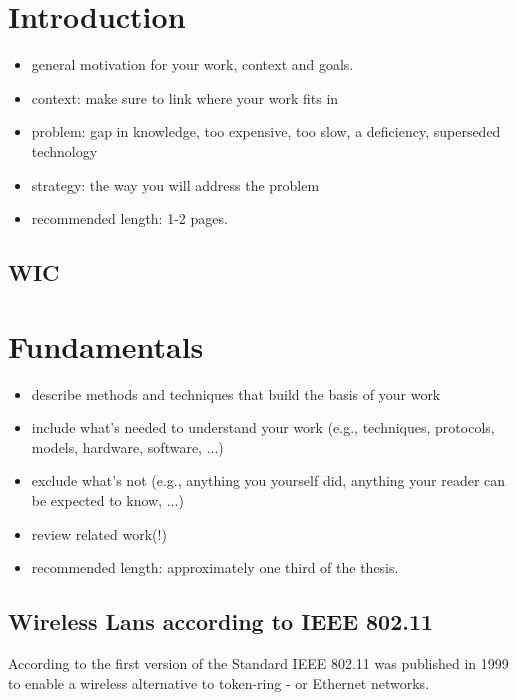 \documentclass[]{nsm-thesis}
\begin{document}
\cleardoublepage
{}


\chapter{Introduction}
\label{sec:introduction}

\begin{itemize}
\item general motivation for your work, context and goals.
\item context: make sure to link where your work fits in
\item problem: gap in knowledge, too expensive, too slow, a deficiency, superseded technology
\item strategy: the way you will address the problem
\item recommended length: 1-2 pages.
\end{itemize}

\section{\acl{WIC}}



\chapter{Fundamentals}
\label{sec:fundamentals}


\begin{itemize}
\item describe methods and techniques that build the basis of your work
\item include what's needed to understand your work (e.g., techniques, protocols, models, hardware, software, ...)
\item exclude what's not (e.g., anything you yourself did, anything your reader can be expected to know, ...)
\item review related work(!)
\item recommended length: approximately one third of the thesis.
\end{itemize}

\section{Wireless Lans according to IEEE 802.11}
According to \textcite{kauffels_wireless_2002} the first version of the Standard IEEE 802.11 was published in 1999 to enable a wireless alternative to token-ring - or Ethernet networks.
\end{document}
